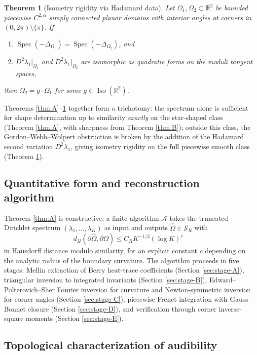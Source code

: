 \documentclass[11pt,reqno]{amsart}
\theoremstyle{plain}
\newtheorem{theorem}{Theorem}[section]
\theoremstyle{definition}
\theoremstyle{remark}
\DeclareMathOperator{\Spec}{Spec}
\DeclareMathOperator{\Iso}{Iso}
\newcommand{\Reals}{\mathbb{R}}
\newcommand{\Scal}{\mathcal{S}}
\begin{document}
\begin{theorem}[Isometry rigidity via Hadamard data]\label{thm:C}
Let $\Omega_1, \Omega_2 \subset \Reals^2$ be bounded piecewise $C^{2,\alpha}$ simply connected planar domains with interior angles at corners in $(0, 2\pi) \setminus \{\pi\}$. If
\begin{enumerate}
\item[\rm(i)] $\Spec(-\Delta_{\Omega_1}) = \Spec(-\Delta_{\Omega_2})$, and
\item[\rm(ii)] $D^2\lambda_1|_{\Omega_1}$ and $D^2\lambda_1|_{\Omega_2}$ are isomorphic as quadratic forms on the moduli tangent spaces,
\end{enumerate}
then $\Omega_2 = g \cdot \Omega_1$ for some $g \in \Iso(\Reals^2)$.
\end{theorem}

Theorems \ref{thm:A}--\ref{thm:C} together form a trichotomy: the spectrum alone is sufficient for shape determination up to similarity \emph{exactly} on the star-shaped class (Theorem \ref{thm:A}, with sharpness from Theorem \ref{thm:B}); outside this class, the Gordon--Webb--Wolpert obstruction is broken by the addition of the Hadamard second variation $D^2\lambda_1$, giving isometry rigidity on the full piecewise smooth class (Theorem \ref{thm:C}).

\subsection{Quantitative form and reconstruction algorithm}\label{ss:quantitative-intro}

Theorem \ref{thm:A} is constructive: a finite algorithm $\mathcal{A}$ takes the truncated Dirichlet spectrum $(\lambda_1, \dots, \lambda_K)$ as input and outputs $\widehat\Omega \in \Scal_R$ with
\[
d_H(\partial\widehat\Omega, \partial\Omega) \leq C_R K^{-1/2}(\log K)^c
\]
in Hausdorff distance modulo similarity, for an explicit constant $c$ depending on the analytic radius of the boundary curvature. The algorithm proceeds in five stages: Mellin extraction of Berry heat-trace coefficients (Section \ref{sec:stage-A}), triangular inversion to integrated invariants (Section \ref{sec:stage-B}), Edward--Polterovich--Sher Fourier inversion for curvature and Newton-symmetric inversion for corner angles (Section \ref{sec:stage-C}), piecewise Frenet integration with Gauss--Bonnet closure (Section \ref{sec:stage-D}), and verification through corner inverse-square moments (Section \ref{sec:stage-E}).

\subsection{Topological characterization of audibility}\label{ss:topological-characterization}
\end{document}
